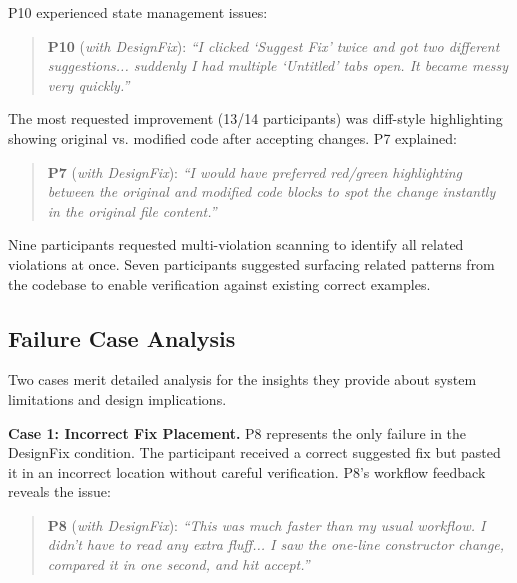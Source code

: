 \documentclass[conference]{IEEEtran}
\newcommand{\pquote}[3]{%
\vspace{2pt}
\begin{quote}\small
\textbf{#1} (\emph{#2}): \emph{``#3''}
\end{quote}
\vspace{2pt}
}
\begin{document}
P10 experienced state management issues: 
\pquote{P10}{with DesignFix}{I clicked `Suggest Fix' twice and got two different suggestions... suddenly I had multiple `Untitled' tabs open. It became messy very quickly.}




The most requested improvement (13/14 participants) was diff-style highlighting showing original vs. modified code after accepting changes. P7 explained: 
\pquote{P7}{with DesignFix}{I would have preferred red/green highlighting between the original and modified code blocks to spot the change instantly in the original file content.}



Nine participants requested multi-violation scanning to identify all related violations at once. Seven participants suggested surfacing related patterns from the codebase to enable verification against existing correct examples.


\subsection{Failure Case Analysis}

Two cases merit detailed analysis for the insights they provide about system limitations and design implications.

\textbf{Case 1: Incorrect Fix Placement.} P8 represents the only failure in the DesignFix condition. The participant received a correct suggested fix 
but pasted it in an incorrect location without careful verification. 
P8's workflow feedback reveals the issue: 
\pquote{P8}{with DesignFix}{This was much faster than my usual workflow. I didn't have to read any extra fluff... I saw the one-line constructor change, compared it in one second, and hit accept.}

\end{document}
